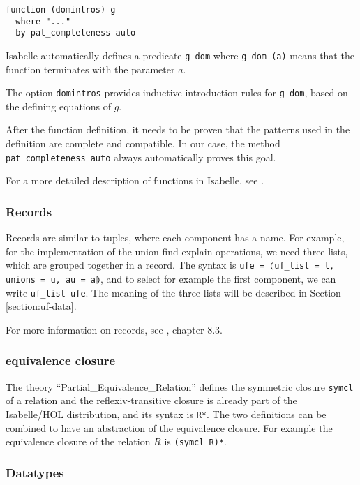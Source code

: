 \begin{lstlisting}
function (domintros) g
  where "..."
  by pat_completeness auto
\end{lstlisting}

Isabelle automatically defines a predicate \lstinline|g_dom| where \lstinline{g_dom (a)} means that the function terminates with the parameter $a$.

The option \lstinline{domintros} provides inductive introduction rules for \lstinline|g_dom|, based on the defining equations of $g$.

After the function definition, it needs to be proven that the patterns used in the definition are complete and compatible. In our case, the method \lstinline|pat_completeness auto| always automatically proves this goal.

For a more detailed description of functions in Isabelle, see \cite{functions}.

\subsubsection{Records}

Records are similar to tuples, where each component has a name. For example, for the implementation of the union-find explain operations, we need three lists, which are grouped together in a record. The syntax is \lstinline{ufe = ⦇uf_list = l, unions = u, au = a⦈}, and to select for example the first component, we can write \lstinline{uf_list ufe}. The meaning of the three lists will be described in Section \ref{section:uf-data}.

For more information on records, see \cite{isabelle}, chapter 8.3.

\subsubsection{equivalence closure}

The theory ``Partial\_Equivalence\_Relation''\cite{Collections-AFP} defines the symmetric closure \lstinline{symcl} of a relation and the reflexiv-transitive closure is already part of the Isabelle/HOL distribution, and its syntax is \lstinline{R*}. The two definitions can be combined to have an abstraction of the equivalence closure. For example the equivalence closure of the relation $R$ is \lstinline{(symcl R)*}.

\subsubsection{Datatypes}
\label{subsubsection:datatypes}

